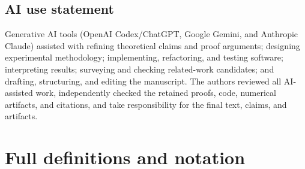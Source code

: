 \documentclass{article}
\theoremstyle{definition}
\theoremstyle{remark}
\begin{document}
\label{page:main-end}



\subsection*{AI use statement}
Generative AI tools (OpenAI Codex/ChatGPT, Google Gemini, and Anthropic Claude) assisted with refining theoretical claims and proof arguments; designing experimental methodology; implementing, refactoring, and testing software; interpreting results; surveying and checking related-work candidates; and drafting, structuring, and editing the manuscript. The authors reviewed all AI-assisted work, independently checked the retained proofs, code, numerical artifacts, and citations, and take responsibility for the final text, claims, and artifacts.

\newpage
\appendix
\renewcommand{\thesection}{\Alph{section}}
\renewcommand{\thesubsection}{\Alph{section}.\arabic{subsection}}
\renewcommand{\theequation}{\Alph{section}.\arabic{equation}}
\renewcommand{\thetheorem}{\Alph{section}.\arabic{theorem}}
\renewcommand{\theproposition}{\Alph{section}.\arabic{proposition}}
\renewcommand{\thecorollary}{\Alph{section}.\arabic{corollary}}
\renewcommand{\thelemma}{\Alph{section}.\arabic{lemma}}
\renewcommand{\thedefinition}{\Alph{section}.\arabic{definition}}
\renewcommand{\thefigure}{\Alph{section}.\arabic{figure}}
\renewcommand{\thetable}{\Alph{section}.\arabic{table}}

\renewcommand{\theHsection}{\Alph{section}}
\renewcommand{\theHequation}{\Alph{section}.\arabic{equation}}
\renewcommand{\theHtheorem}{\Alph{section}.\arabic{theorem}}
\renewcommand{\theHproposition}{\Alph{section}.\arabic{proposition}}
\renewcommand{\theHcorollary}{\Alph{section}.\arabic{corollary}}
\renewcommand{\theHlemma}{\Alph{section}.\arabic{lemma}}
\renewcommand{\theHdefinition}{\Alph{section}.\arabic{definition}}
\renewcommand{\theHtable}{\Alph{section}.\arabic{table}}
\renewcommand{\theHfigure}{\Alph{section}.\arabic{figure}}

\section{Full definitions and notation}
\label{app:definitions}
\setcounter{equation}{0}
\setcounter{theorem}{0}
\setcounter{table}{0}
\setcounter{figure}{0}
\end{document}
